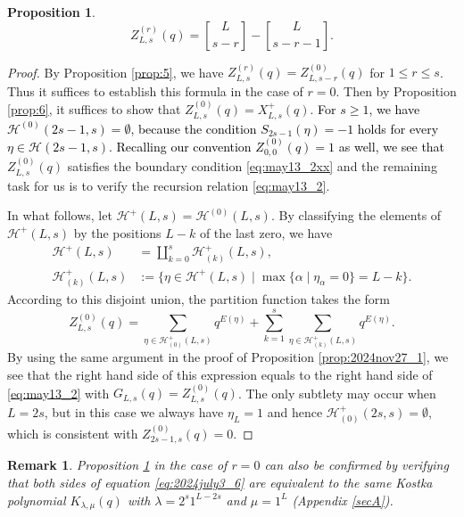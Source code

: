 \documentclass[sn-mathphys-num]{sn-jnl}%
\newcommand{\red}[1]{\textcolor{black}{#1}}
\theoremstyle{thmstyleone}%
\newtheorem{proposition}[theorem]{Proposition}%
\theoremstyle{thmstyletwo}%
\newtheorem{remark}{Remark}%
\theoremstyle{thmstylethree}%
\begin{document}
\begin{proposition}\label{prop:10}
\begin{equation}\label{eq:2024july3_6}
Z_{L,s}^{(r)}(q) = 
{ L \brack s -r}- { L \brack s-r-1}. 
\end{equation}
\end{proposition}
\begin{proof}
By Proposition \ref{prop:5}, we have $Z_{L,s}^{(r)}(q) = Z_{L,s-r}^{(0)}(q)$ for $1 \leq r \leq s$.
Thus it suffices to establish this formula in the case of $r=0$.
Then by Proposition \ref{prop:6}, it suffices to show that $Z^{(0)}_{L,s}(q)  =X^{+}_{L,s}(q)$.
\red{For $s \geq 1$, we have $\mathcal{H}^{(0)} (2s-1,s) = \emptyset$, because the condition
$S_{2s-1}(\eta) = -1$ holds for every $\eta \in \mathcal{H}(2s-1,s)$.
Recalling our convention $Z_{0,0}^{(0)}(q) =1$ as well,  we see that}
$Z^{(0)}_{L,s}(q)$ satisfies the boundary condition \eqref{eq:may13_2xx}
and the remaining task for us is to verify the recursion relation \eqref{eq:may13_2}.


In what follows, let $\mathcal{H}^{+} (L,s) = \mathcal{H}^{(0)} (L,s)$.
By classifying the elements of $\mathcal{H}^{+} (L,s)$ by the positions $L-k$ of 
the last zero, we have
\begin{align*}
\mathcal{H}^{+} (L,s) &= \coprod_{k = 0}^s \mathcal{H}^{+}_{(k)} (L,s),\\
\mathcal{H}^{+}_{(k)} (L,s) &:= \{ \eta \in \mathcal{H}^{+} (L,s) \mid
\max \{ \alpha \mid \eta_\alpha=0 \} = L-k \}. 
\end{align*}
According to this disjoint union, the partition function takes the form
\begin{equation*}
Z^{(0)}_{L,s}(q) =
\sum_{\eta \in \mathcal{H}^{+}_{(0)}  (L,s)} q^{E(\eta)} +
\sum_{k=1}^s \sum_{\eta \in \mathcal{H}^{+}_{(k)}  (L,s)} q^{E(\eta)}.
\end{equation*}
By using the same argument in the proof of Proposition \ref{prop:2024nov27_1},
we see that the right hand side of this expression
equals to the right hand side of \eqref{eq:may13_2} with $G_{L,s}(q) =Z^{(0)}_{L,s}(q)$.
The only subtlety may occur when $L=2s$, but in this case we always have $\eta_L = 1$ and hence 
$\mathcal{H}^{+}_{(0)}  (2s,s) = \emptyset$, which is consistent with
$Z^{(0)}_{2s-1,s}(q)=0$.
\end{proof}
{
\begin{remark}
Proposition \ref{prop:10} in the case of $r=0$ can also be confirmed by
verifying that both sides of equation \eqref{eq:2024july3_6} are equivalent to
the same Kostka polynomial $K_{\lambda, \mu}(q)$ with
$\lambda =2^s 1^{L-2s}$ and $\mu =1^L$ (Appendix \ref{secA}).
\end{remark}
}
\end{document}
